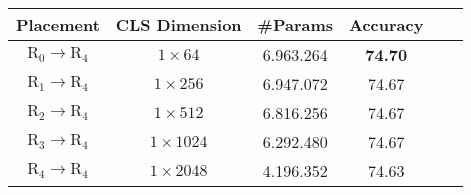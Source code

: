     \begin{table}[t]
        \centering
        \scriptsize
        \setlength{\tabcolsep}{2.5pt}
        \begin{tabular}{cccccc}\toprule
             Placement&CLS Dimension&\#Params&Accuracy\\\midrule
             $\mbox{R}_0\rightarrow\mbox{R}_4$&$1\times64$&6.963.264&\textbf{74.70}\\
             $\mbox{R}_1\rightarrow\mbox{R}_4$&$1\times256$&6.947.072&74.67\\
             $\mbox{R}_2\rightarrow\mbox{R}_4$&$1\times512$&6.816.256&74.67\\
             $\mbox{R}_3\rightarrow\mbox{R}_4$&$1\times1024$&6.292.480&74.67\\
             $\mbox{R}_4\rightarrow\mbox{R}_4$&$1\times2048$&4.196.352&74.63\\\bottomrule
        \end{tabular}
        

\end{table}
